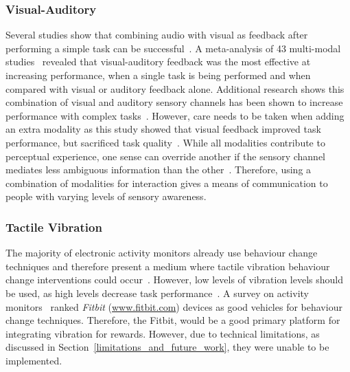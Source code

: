 \subsubsection{Visual-Auditory}
Several studies show that combining audio with visual as feedback after performing a simple task can be successful~\cite{benefits_of_audio_visual_1, benefits_of_audio_visual_2}. A meta-analysis of 43 multi-modal studies~\cite{comparing_modalities_effects_of_visual_auditory} revealed that visual-auditory feedback was the most effective at increasing performance, when a single task is being performed and when compared with visual or auditory feedback alone. Additional research shows this combination of visual and auditory sensory channels has been shown to increase performance with complex tasks~\cite{chi_oussama_tap_the_shapetones}. However, care needs to be taken when adding an extra modality as this study showed that visual feedback improved task performance, but sacrificed task quality~\cite{comparing_modalities_effects_of_visual_auditory}. While all modalities contribute to perceptual experience, one sense can override another if the sensory channel mediates less ambiguous information than the other~\cite{one_mode_override_another}. Therefore, using a combination of modalities for interaction gives a means of communication to people with varying levels of sensory awareness.

\subsubsection{Tactile Vibration}
The majority of electronic activity monitors already use behaviour change techniques and therefore present a medium where tactile vibration behaviour change interventions could occur~\cite{benefits_of_audio_visual_1, article_designing_for_health_behaviour_change_hci}. However, low levels of vibration levels should be used, as high levels decrease task performance~\cite{high_audio_feedback_negative_performance}. A survey on activity monitors~\cite{article_wearable_good} ranked \textit{Fitbit} (\url{www.fitbit.com}) devices as good vehicles for behaviour change techniques. Therefore, the Fitbit, would be a good primary platform for integrating vibration for rewards. However, due to technical limitations, as discussed in Section~\ref{limitations_and_future_work}, they were unable to be implemented.


